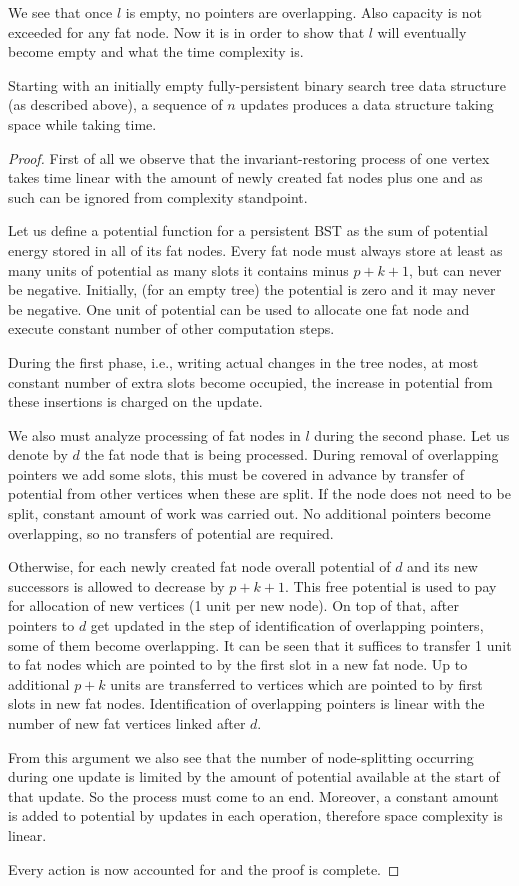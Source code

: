 We see that once $l$ is empty, no pointers are overlapping. Also capacity is not exceeded for any fat node. Now it is in order to show that $l$ will eventually become empty and what the time complexity is.

\begin{prop}
Starting with an initially empty fully-persistent binary search tree data structure (as described above), a sequence of $n$ updates produces a data structure taking  space while taking  time.
\end{prop}

\begin{proof}
First of all we observe that the invariant-restoring process of one vertex takes time linear with the amount of newly created fat nodes plus one and as such can be ignored from complexity standpoint.
	
Let us define a potential function for a persistent BST as the sum of potential energy stored in all of its fat nodes. 
Every fat node must always store at least as many units of potential as many slots it contains minus $p+k+1$, but can never be negative. 
Initially, (for an empty tree) the potential is zero and it may never be negative. One unit of potential can be used to allocate one fat node and execute constant number of other computation steps.

During the first phase, i.e., writing actual changes in the tree nodes, at most constant number of extra slots become occupied, the increase in potential from these insertions is charged on the update.

We also must analyze processing of fat nodes in $l$ during the second phase. Let us denote by $d$ the fat node that is being processed. 
During removal of overlapping pointers we add some slots, this must be covered in advance by transfer of potential from other vertices when these are split. 
If the node does not need to be split, constant amount of work was carried out. 
No additional pointers become overlapping, so no transfers of potential are required.

Otherwise, for each newly created fat node overall potential of $d$ and its new successors is allowed to decrease by $p+k+1$.
This free potential is used to pay for allocation of new vertices (1 unit per new node). 
On top of that, after pointers to $d$ get updated in the step of identification of overlapping pointers, some of them become overlapping. 
It can be seen that it suffices to transfer 1 unit to fat nodes which are pointed to by the first slot in a new fat node. 
Up to additional $p+k$ units are transferred to vertices which are pointed to by first slots in new fat nodes.
Identification of overlapping pointers is linear with the number of new fat vertices linked after $d$.

From this argument we also see that the number of node-splitting occurring during one update is limited by the amount of potential available at the start of that update. 
So the process must come to an end. 
Moreover, a constant amount is added to potential by updates in each operation, therefore space complexity is linear.

Every action is now accounted for and the proof is complete.
\end{proof}

